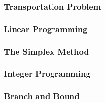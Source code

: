 
\begin{frame}[ctb!]
  \frametitle{Transportation Problem}
  
\end{frame}

\begin{frame}[ctb!]
  \frametitle{Linear Programming}
  
\end{frame}

\begin{frame}[ctb!]
  \frametitle{The Simplex Method}
  
\end{frame}

\begin{frame}[ctb!]
  \frametitle{Integer Programming}
  
\end{frame}

\begin{frame}[ctb!]
  \frametitle{Branch and Bound}
  
\end{frame}
